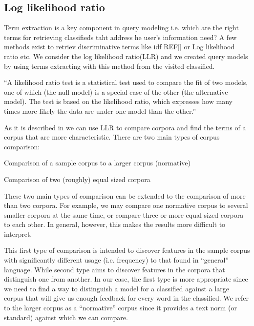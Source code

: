 \subsection{Log likelihood ratio}

Term extraction is a key component in query modeling i.e. which are the right terms for retrieving classifieds taht address he user's information need? A few methods exist to retriev discriminative terms like idf REF[] or Log likelihood ratio etc. We consider the log likelihood ratio(LLR) and we created query models by using terms extracting with this method from the visited classified.

``A likelihood ratio test is a statistical test used to compare the fit of two models, one of which (the null model) is a special case of the other (the alternative model). The test is based on the likelihood ratio, which expresses how many times more likely the data are under one model than the other.''

As it is described in \cite{RaysonGarside} we can use LLR to compare corpora and find the terms of a corpus that are more characteristic. There are two main types of corpus comparison:

\begin{list}{.}{}
\item Comparison of a sample corpus to a larger corpus (normative)
\item Comparison of two (roughly) equal sized corpora
\end{list}

These two main types of comparison can be extended to the comparison of more than two corpora. For example, we may compare one normative corpus to several smaller corpora at the same time, or compare three or more equal sized corpora to each other. In general, however, this makes the results more difficult to interpret.

This first type of comparison is intended to discover features in the sample corpus with significantly different usage (i.e. frequency) to that found in ``general'' language. While second type aims to discover features in the corpora that distinguish one from another. In our case, the first type is more appropriate since we need to find a way to distinguish a model for a classified against a large corpus that will give us enough feedback for every word in the classified. We refer to the larger corpus as a ``normative'' corpus since it provides a text norm (or standard) against which we can compare.

